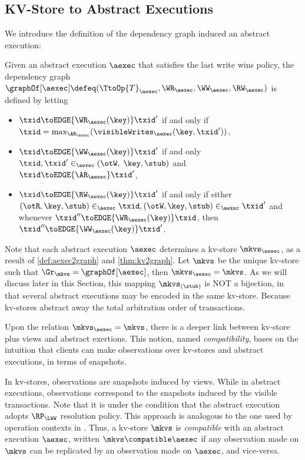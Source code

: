 \subsection{KV-Store to Abstract Executions}
\label{app:aexec2kv}
\label{sec:thm:aexec2kv-compatible-proof}

We introduce the definition of the dependency graph induced an abstract execution:

\begin{definition}
\label{def:aexec2graph}
Given an abstract execution $\aexec$ that satisfies the last write wins policy,
the dependency graph $\graphOf[\aexec] \defeq (\TtoOp{T}_{\aexec}, \WR_{\aexec}, 
\WW_{\aexec}, \RW_{\aexec})$ is defined by letting
\begin{itemize}
\item $\txid \toEDGE{\WR_{\aexec}(\key)} \txid'$ if and only if 
$\txid = \max_{\AR_{\aexec}}(\visibleWrites_{\aexec}(\key, \txid'))$, 
\item $\txid \toEDGE{\WW_{\aexec}(\key)} \txid'$ if and only 
$\txid, \txid' \in_{\aexec} (\otW, \;\key, \stub)$ 
and $\txid \toEDGE{\AR_{\aexec}} \txid'$,
\item $\txid \toEDGE{\RW_{\aexec}(\key)} \txid'$ if and only if either 
$(\otR, \key, \stub) \in_{\aexec} \txid, (\otW, \key, \stub) \in_{\aexec} \txid'$ and 
whenever $\txid'' \toEDGE{\WR_{\aexec}(\key)} \txid$, 
then $\txid'' \toEDGE{\WW_{\aexec}(\key)} \txid'$.
\end{itemize}
\end{definition}

Note that each abstract execution $\aexec$ determines a kv-store $\mkvs_{\aexec}$,
as a result of \cref{def:aexec2graph} and \cref{thm:kv2graph}. 
Let $\mkvs$ be the unique kv-store such that $\Gr_{\mkvs} = \graphOf[\aexec]$, then $\mkvs_{\aexec} = \mkvs$. 
As we will discuss later in this Section,
this mapping $\mkvs_{(\stub)}$ is NOT a bijection, 
in that several abstract executions may be encoded in the same kv-store.
Because kv-stores abstract away the total arbitration order of transactions.

Upon the relation \( \mkvs_{\aexec} = \mkvs \),
there is a deeper link between kv-store plus views and abstract exertions.
This notion, named \emph{compatibility}, bases on the intuition that 
clients can make observations over kv-stores and abstract executions, in terms of snapshots.

In kv-stores, observations are snapshots induced by views. 
While in abstract executions, observations correspond to the snapshots induced by the visible transactions.
Note that it is under the condition that the abstract execution adopts $\RP_{\LWW}$ resolution policy.
This approach is analogous to the one used by operation contexts in \cite{repldatatypes}.
Thus, a kv-store $\mkvs$ is \emph{compatible} with an abstract execution $\aexec$, written \( \mkvs \compatible \aexec \)
if any observation made on $\mkvs$ can be replicated by an observation made on $\aexec$, and vice-versa. 

